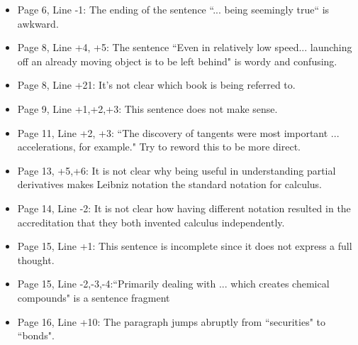 \documentclass[11pt]{article}
\begin{document}
\begin{itemize}
\begin{itemize}
		\item Page 6, Line -1: The ending of the sentence ``... being seemingly true`` is awkward.
		\item Page 8, Line +4, +5: The sentence ``Even in relatively low speed... launching off an already moving object is to be left behind" is wordy and confusing. 
		\item Page 8, Line +21: It's not clear which book is being referred to.
		\item Page 9, Line +1,+2,+3: This sentence does not make sense. 
		\item Page 11, Line +2, +3: ``The discovery of tangents were most important ... accelerations, for example." Try to reword this to be more direct.
		\item Page 13, +5,+6: It is not clear why being useful in understanding partial derivatives makes Leibniz notation the standard notation for calculus.
		\item Page 14, Line -2: It is not clear how having different notation resulted in the accreditation that they both invented calculus independently.
		\item Page 15, Line +1: This sentence is incomplete since it does not express a full thought.
		\item Page 15, Line -2,-3,-4:``Primarily dealing with ... which creates chemical compounds" is a sentence fragment
		\item Page 16, Line +10: The paragraph jumps abruptly from ``securities" to ``bonds".
	\end{itemize}
	

\end{itemize}
\end{document}
